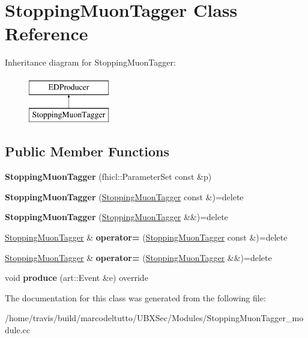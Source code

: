 \hypertarget{classStoppingMuonTagger}{\section{Stopping\-Muon\-Tagger Class Reference}
\label{classStoppingMuonTagger}
}
Inheritance diagram for Stopping\-Muon\-Tagger\-:\begin{figure}[H]
\begin{center}
\leavevmode
\includegraphics[height=2.000000cm]{classStoppingMuonTagger}
\end{center}
\end{figure}
\subsection*{Public Member Functions}
\begin{DoxyCompactItemize}
\item 
\hypertarget{classStoppingMuonTagger_a3ebd20018e8b0899e94bb3a01cc718be}{{\bfseries Stopping\-Muon\-Tagger} (fhicl\-::\-Parameter\-Set const \&p)}\label{classStoppingMuonTagger_a3ebd20018e8b0899e94bb3a01cc718be}

\item 
\hypertarget{classStoppingMuonTagger_a6a544fa555882979e4e288c91a362d75}{{\bfseries Stopping\-Muon\-Tagger} (\hyperlink{classStoppingMuonTagger}{Stopping\-Muon\-Tagger} const \&)=delete}\label{classStoppingMuonTagger_a6a544fa555882979e4e288c91a362d75}

\item 
\hypertarget{classStoppingMuonTagger_a9b6df4c680a52bfcc04a6c870d8b02c1}{{\bfseries Stopping\-Muon\-Tagger} (\hyperlink{classStoppingMuonTagger}{Stopping\-Muon\-Tagger} \&\&)=delete}\label{classStoppingMuonTagger_a9b6df4c680a52bfcc04a6c870d8b02c1}

\item 
\hypertarget{classStoppingMuonTagger_aa694be13fa360184be18359f555e788e}{\hyperlink{classStoppingMuonTagger}{Stopping\-Muon\-Tagger} \& {\bfseries operator=} (\hyperlink{classStoppingMuonTagger}{Stopping\-Muon\-Tagger} const \&)=delete}\label{classStoppingMuonTagger_aa694be13fa360184be18359f555e788e}

\item 
\hypertarget{classStoppingMuonTagger_a79fe9dd28e135cca483643a3b158656a}{\hyperlink{classStoppingMuonTagger}{Stopping\-Muon\-Tagger} \& {\bfseries operator=} (\hyperlink{classStoppingMuonTagger}{Stopping\-Muon\-Tagger} \&\&)=delete}\label{classStoppingMuonTagger_a79fe9dd28e135cca483643a3b158656a}

\item 
\hypertarget{classStoppingMuonTagger_acc39137db682cee3fac909296244b77a}{void {\bfseries produce} (art\-::\-Event \&e) override}\label{classStoppingMuonTagger_acc39137db682cee3fac909296244b77a}

\end{DoxyCompactItemize}


The documentation for this class was generated from the following file\-:\begin{DoxyCompactItemize}
\item 
/home/travis/build/marcodeltutto/\-U\-B\-X\-Sec/\-Modules/Stopping\-Muon\-Tagger\-\_\-module.\-cc\end{DoxyCompactItemize}

